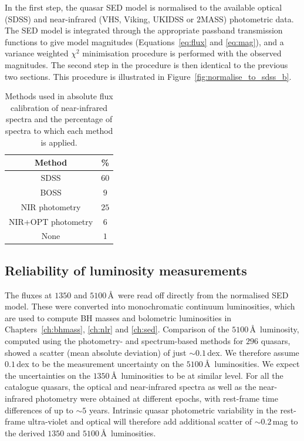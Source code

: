 In the first step, the quasar SED model is normalised to the available optical (SDSS) and near-infrared (VHS, Viking, UKIDSS or $2$MASS) photometric data. 
The SED model is integrated through the appropriate passband transmission functions to give model magnitudes (Equations~\ref{eq:flux} and \ref{eq:mag}), and a variance weighted $\chi^2$ minimisation procedure is performed with the observed magnitudes.
The second step in the procedure is then identical to the previous two sections.   
This procedure is illustrated in Figure~\ref{fig:normalise_to_sdss_b}. 

\begin{table}
  \centering
  \footnotesize 
    \begin{tabular}{cc} 
    \hline
    Method & \% \\
    \hline
    SDSS               & $60$ \\
    BOSS               & $9$ \\
    NIR photometry     & $25$ \\
    NIR+OPT photometry & $6$ \\
    None               & $1$ \\    
    \hline
    \end{tabular}
    \caption[{Methods used in absolute flux calibration of near-infrared spectra.}]{Methods used in absolute flux calibration of near-infrared spectra and the percentage of spectra to which each method is applied.}
  \label{tab:flux_calibration}
\end{table} 

\subsection{Reliability of luminosity measurements}

The fluxes at $1350$ and $5100$\,\AA\, were read off directly from the normalised SED model. 
These were converted into monochromatic continuum luminosities, which are used to compute BH masses and bolometric luminosities in Chapters~\ref{ch:bhmass}, \ref{ch:nlr} and \ref{ch:sed}. 
Comparison of the $5100$\,\AA\, luminosity, computed using the photometry- and spectrum-based methods for $296$ quasars, showed a scatter (mean absolute deviation) of just $\sim0.1$\,dex.
We therefore assume $0.1$\,dex to be the measurement uncertainty on the $5100$\,\AA\, luminosities.
We expect the uncertainties on the $1350$\,\AA\, luminosities to be at similar level.  
For all the catalogue quasars, the optical and near-infrared spectra as well as the near-infrared photometry were obtained at different epochs, with rest-frame time differences of up to $\sim5$ years. 
Intrinsic quasar photometric variability in the rest-frame ultra-violet and optical will therefore add additional scatter of $\sim0.2$\,mag \citep[e.g.][]{macleod10} to the derived $1350$ and $5100$\,\AA\, luminosities.

